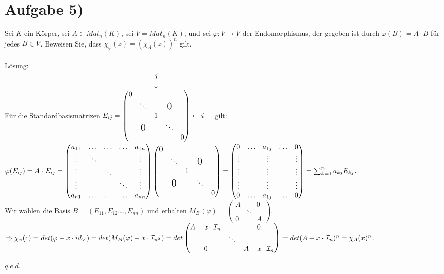 \documentclass[a4paper]{article}
\newcommand{\ul}{\underline}
\renewcommand{\qed}{\begin{flushright}
\ul{\(q.e.d.\)}
\end{flushright}}
\let\phi\varphi
\begin{document}
\section*{Aufgabe 5)}
Sei \(K\) ein Körper, sei \(A\in Mat_n(K)\), sei \(V=Mat_n(K)\), und sei \(\phi:V\rightarrow V\) der Endomorphismus, der gegeben ist durch \(\phi(B)=A\cdot B\) für jedes \(B\in V\). Beweisen Sie, dass \(\chi_\phi(z)=(\chi_A(z))^n\) gilt.\\\\
\ul{Lösung:}\\
\(\hspace*{212pt}j\)\\
\(\hspace*{212pt}\downarrow\)\\
Für die Standardbasismatrizen \(E_{ij}=\begin{pmatrix}
0 & & & &  \\
 & \ddots & & \mbox{\Large 0} & \\
 & & 1 & & \\
 & \mbox{\Large 0} & & \ddots & \\
 & & & & 0
\end{pmatrix}\leftarrow i\)\ \ \ gilt:\\
\(\phi(E_{ij})=A\cdot E_{ij}=\begin{pmatrix}
a_{11} & \hdots & \hdots & \hdots & a_{1n} \\
\vdots & \ddots & & & \vdots \\
\vdots & & \ddots & & \vdots \\
\vdots & & & \ddots & \vdots \\
a_{n1} & \hdots & \hdots & \hdots & a_{nn}
\end{pmatrix}
\begin{pmatrix}
0 & & & & \\
 & \ddots & & \mbox{\Large 0} & \\
 & & 1 & & \\
 & \mbox{\Large 0} & & \ddots & \\
 & & & & 0
\end{pmatrix}=\begin{pmatrix}
0 & \hdots & a_{1j} & \hdots & 0 \\
\vdots & & \vdots & & \vdots \\
\vdots & & \vdots & & \vdots \\
\vdots & & \vdots & & \vdots \\
0 & \hdots & a_{1j} & \hdots & 0
\end{pmatrix}=\sum_{k=1}^{n}a_{kj}E_{kj}\).\\
Wir wählen die Basis \(B=(E_{11},E_{12}...,E_{nn})\) und erhalten \(M_B(\phi)=\begin{pmatrix}
A & & 0 \\
 & \ddots & \\
0 & & A
\end{pmatrix}\).
\(\Rightarrow\chi_\phi(c)=det(\phi-x\cdot id_V)=det(M_B(\phi)-x\cdot \mathcal{I}_{n^2})=\\
det\begin{pmatrix}
A-x\cdot \mathcal{I}_n & & 0 \\
 & \ddots & \\
0 & & A-x\cdot \mathcal{I}_n
\end{pmatrix}=det(A-x\cdot \mathcal{I}_n)^n=\chi_A(x)^n\).
\qed
\end{document}
